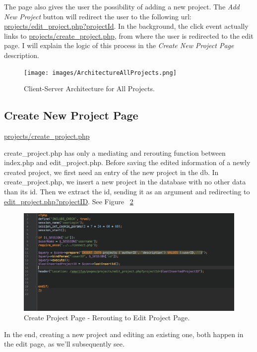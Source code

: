 The page also gives the user the possibility of adding a new project. The \textit{Add New Project} button will redirect the user to the following url:
\url{projects/edit\_project.php?projectId}. In the background, the click event actually links to \url{projects/create\_project.php}, from where the user is redirected to the edit page. I will explain the logic of this process in the \textit{Create New Project Page} description.

\begin{figure}
\texttt{[image: images/ArchitectureAllProjects.png]}
\caption{Client-Server Architecture for All Projects.}
\label{fig:architecture_all_projects}
\end{figure}

\subsection{Create New Project Page}
\url{projects/create\_project.php}

create\_project.php has only a mediating and rerouting function between index.php and edit\_project.php. Before saving the edited information of a newly created project, we first need an entry of the new project in the db. 
In create\_project.php, we insert a new project in the database with no other data than its id. Then we extract the id, sending it as an argument and redirecting to \url{edit\_project.php?projectID}. See Figure ~\ref{fig:create_project}

\begin{figure}
\includegraphics[width=1\linewidth]{images/CreateProjectPage.png}
\caption{Create Project Page - Rerouting to Edit Project Page.}
\label{fig:create_project}
\end{figure}


In the end, creating a new project and editing an existing one, both happen in the edit page, as we'll subsequently see.

